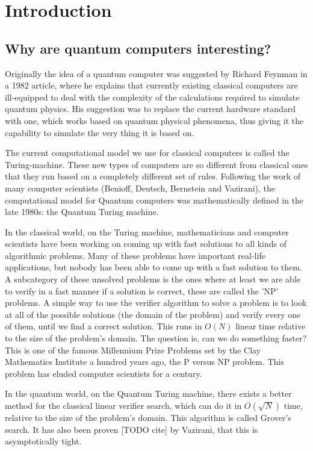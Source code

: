 \chapter{Introduction}

\section{Why are quantum computers interesting?}

Originally the idea of a quantum computer was suggested by Richard Feynman in a 1982 article\cite{feynman_simulating_1982}, where he explains that currently existing classical computers are ill-equipped to deal with the complexity of the calculations required to simulate quantum physics. His suggestion was to replace the current hardware standard with one, which works based on quantum physical phenomena, thus giving it the capability to simulate the very thing it is based on.

The current computational model we use for classical computers is called the Turing-machine. These new types of computers are so different from classical ones that they run based on a completely different set of rules. Following the work of many computer scientists (Benioff, Deutsch, Bernstein and Vazirani), the computational model for Quantum computers was mathematically defined in the late 1980s: the Quantum Turing machine.

In the classical world, on the Turing machine, mathematicians and computer scientists have been working on coming up with fast solutions to all kinds of algorithmic problems. Many of these problems have important real-life applications, but nobody has been able to come up with a fast solution to them. A subcategory of these unsolved problems is the ones where at least we are able to verify in a fast manner if a solution is correct, these are called the 'NP' problems. A simple way to use the verifier algorithm to solve a problem is to look at all of the possible solutions (the domain of the problem) and verify every one of them, until we find a correct solution. This runs in $O(N)$ linear time relative to the size of the problem's domain. The question is, can we do something faster? This is one of the famous Millennium Prize Problems set by the Clay Mathematics Institute a hundred years ago, the P versus NP problem. This problem has eluded computer scientists for a century.

In the quantum world, on the Quantum Turing machine, there exists a better method for the classical linear verifier search, which can do it in $O(\sqrt{N})$ time, relative to the size of the problem's domain. This algorithm is called Grover's search. It has also been proven [TODO cite] by Vazirani, that this is asymptotically tight.

